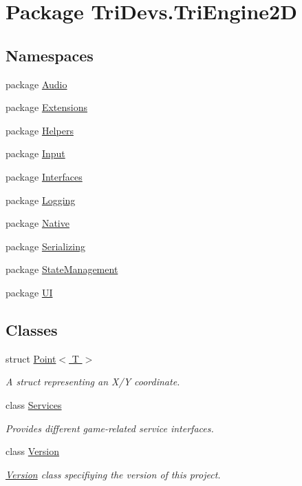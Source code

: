 \hypertarget{namespace_tri_devs_1_1_tri_engine2_d}{\section{Package Tri\-Devs.\-Tri\-Engine2\-D}
\label{namespace_tri_devs_1_1_tri_engine2_d}
}
\subsection*{Namespaces}
\begin{DoxyCompactItemize}
\item 
package \hyperlink{namespace_tri_devs_1_1_tri_engine2_d_1_1_audio}{Audio}
\item 
package \hyperlink{namespace_tri_devs_1_1_tri_engine2_d_1_1_extensions}{Extensions}
\item 
package \hyperlink{namespace_tri_devs_1_1_tri_engine2_d_1_1_helpers}{Helpers}
\item 
package \hyperlink{namespace_tri_devs_1_1_tri_engine2_d_1_1_input}{Input}
\item 
package \hyperlink{namespace_tri_devs_1_1_tri_engine2_d_1_1_interfaces}{Interfaces}
\item 
package \hyperlink{namespace_tri_devs_1_1_tri_engine2_d_1_1_logging}{Logging}
\item 
package \hyperlink{namespace_tri_devs_1_1_tri_engine2_d_1_1_native}{Native}
\item 
package \hyperlink{namespace_tri_devs_1_1_tri_engine2_d_1_1_serializing}{Serializing}
\item 
package \hyperlink{namespace_tri_devs_1_1_tri_engine2_d_1_1_state_management}{State\-Management}
\item 
package \hyperlink{namespace_tri_devs_1_1_tri_engine2_d_1_1_u_i}{U\-I}
\end{DoxyCompactItemize}
\subsection*{Classes}
\begin{DoxyCompactItemize}
\item 
struct \hyperlink{struct_tri_devs_1_1_tri_engine2_d_1_1_point_3_01_t_01_4}{Point$<$ T $>$}
\begin{DoxyCompactList}\small\item\em A struct representing an X/\-Y coordinate. \end{DoxyCompactList}\item 
class \hyperlink{class_tri_devs_1_1_tri_engine2_d_1_1_services}{Services}
\begin{DoxyCompactList}\small\item\em Provides different game-\/related service interfaces. \end{DoxyCompactList}\item 
class \hyperlink{class_tri_devs_1_1_tri_engine2_d_1_1_version}{Version}
\begin{DoxyCompactList}\small\item\em \hyperlink{class_tri_devs_1_1_tri_engine2_d_1_1_version}{Version} class specifiying the version of this project. \end{DoxyCompactList}\end{DoxyCompactItemize}

